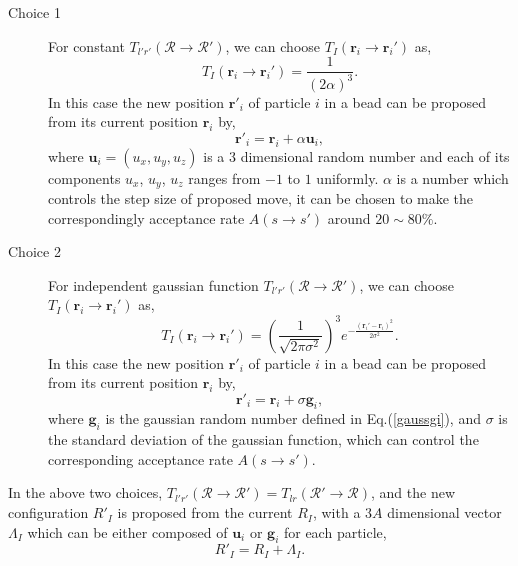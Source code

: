 \documentclass[12pt,letterpaper,UTF8]{report}
\begin{document}
\begin{description}
  \item[Choice 1] For constant $T_{l'r'}(\mathcal{R} \rightarrow \mathcal{R}')$, we can choose $T_{I}(\bm{r}_i \rightarrow \bm{r}_i') $ as,
\begin{equation}
T_{I}(\bm{r}_i \rightarrow \bm{r}_i') = \frac{1}{ (2 \alpha)^3}.
 \label{}
\end{equation}
In this case the new position ${\bm{r}'}_i$ of particle $i$ in a bead can be proposed from its current position ${\bm{r}}_i$ by,
\begin{equation}
  {\bm{r}}'_i =
   {\bm{r}}_i
  + \alpha \bm{u}_i  ,
 \label{uniformmove}
\end{equation}
where $\bm{u}_i=(u_x,u_y,u_z)$ is a 3 dimensional random number and each of its components $u_x$, $u_y$, $u_z$ ranges from $-1$ to $1$ uniformly.
$\alpha$ is a number which controls the step size of proposed move, it can be chosen to make the correspondingly acceptance rate $A(s\rightarrow s')$ around $20 \sim 80\%$.
  \item[Choice 2] For independent gaussian function $T_{l'r'}(\mathcal{R} \rightarrow \mathcal{R}')$, we can choose $T_{I}(\bm{r}_i \rightarrow \bm{r}_i') $ as,
\begin{equation}
T_{I}(\bm{r}_i \rightarrow \bm{r}_i') = \left(\frac{1}{\sqrt{2\pi \sigma^2}}\right)^3 e^{ - \frac{( \bm{r}_i' - \bm{r}_i )^2 }{2 \sigma^2} }.
 \label{}
\end{equation}
In this case the new position ${\bm{r}'}_i$ of particle $i$ in a bead can be proposed from its current position ${\bm{r}}_i$ by,
\begin{equation}
  {\bm{r}}'_i =
   {\bm{r}}_i
  + \sigma \bm{g}_i  ,
 \label{gaussmove}
\end{equation}
where $\bm{g}_i$ is the gaussian random number defined in Eq.(\ref{gaussgi}), and  $\sigma$ is the standard deviation of the gaussian function, which can control the corresponding acceptance rate $A(s\rightarrow s')$.
\end{description}

In the above two choices,
$T_{l'r'}(\mathcal{R} \rightarrow \mathcal{R}') = T_{lr}(\mathcal{R}' \rightarrow \mathcal{R}) $,
and the new configuration $R'_I$ is proposed from the current $R_I$, with a $3A$ dimensional vector $\Lambda_I$ which can be either composed of $\bm{u}_i$ or $\bm{g}_i$ for each particle,
\begin{equation}
 R'_I=R_I+\Lambda_I.
 \label{regsampling1}
\end{equation}
\end{document}
